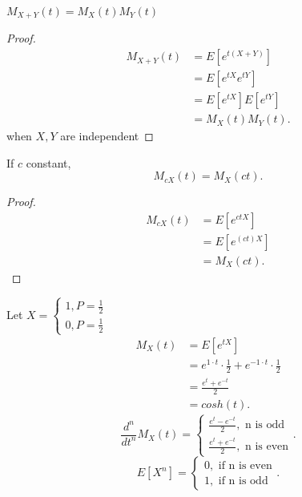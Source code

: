 \documentclass[a4paper]{article}
\begin{document}
\begin{lemma}
  $M_{X+Y}(t) = M_X(t) M_Y(t)$ 
  \begin{proof}
    \begin{align*}
      M_{X+Y}(t) &= E[e^{t(X+Y)}] \\
                 &= E[e^{tX} e^{tY}] \\
                 &= E[e^{tX}] E[e^{tY}] \\
                 &= M_X(t) M_Y(t) 
    .\end{align*}
    when $X,Y$ are independent
  \end{proof}
\end{lemma}

\begin{lemma}
  If $c$ constant,
   \[
  M_{cX} (t) = M_X (ct)
  .\] 
  \begin{proof}
    \begin{align*}
      M_{cX}(t) &= E[e^{ctX}] \\
                &= E[e^{(ct)X}] \\
                &= M_X(ct)
    .\end{align*}
  \end{proof}
\end{lemma}

\begin{note}
Let $X = \begin{cases}
  1, P = \frac{1}{2} \\
  0, P = \frac{1}{2} 
\end{cases}$ 
\begin{align*}
  M_X(t) &= E[e^{tX}] \\
         &= e^{1 \cdot t} \cdot \frac{1}{2} + e^{-1 \cdot t} \cdot \frac{1}{2} \\
         &= \frac{e^{t} + e^{-t}}{2} \\
         &= cosh(t)
.\end{align*}
 \[
\frac{d^{n}}{dt^{n}}M_X(t) = \begin{cases}
  \frac{e^{t} - e^{-t}}{2}, \text{ n is odd} \\
  \frac{e^{t} + e^{-t}}{2}, \text{ n is even} 
\end{cases}
.\] 
\[
  E[X^{n}] = \begin{cases}
    0, \text{ if n is even} \\
    1, \text{ if n is odd} 
  \end{cases}
.\] 
\end{note}
\end{document}
